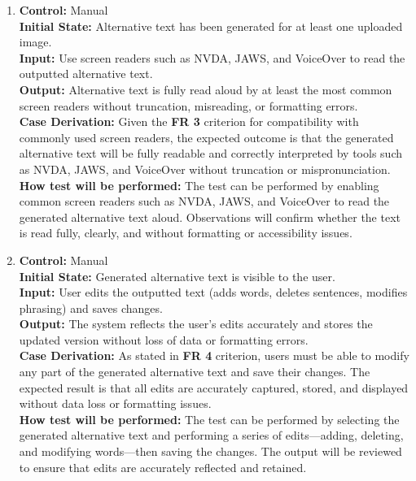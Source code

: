 \documentclass[12pt, titlepage]{article}
\begin{document}
\begin{enumerate}[label=FR-ST \arabic*., wide=0pt, leftmargin=*]
  \item{}
    {\bf Control:} Manual\\
    {\bf Initial State:} Alternative text has been generated for at
    least one uploaded image.\\
    {\bf Input:} Use screen readers such as NVDA, JAWS, and VoiceOver
    to read the outputted alternative text.\\
    {\bf Output:} Alternative text is fully read aloud by at least
    the most common screen readers without truncation, misreading, or
    formatting errors. \\
    {\bf  Case Derivation:} Given the \textbf{FR 3} criterion for
    compatibility with commonly used screen readers, the expected
    outcome is that the generated alternative text will be fully
    readable and correctly interpreted by tools such as NVDA, JAWS,
    and VoiceOver without truncation or mispronunciation.\\
    {\bf How test will be performed:} The test can be performed by
    enabling common screen readers such as NVDA, JAWS, and VoiceOver
    to read the generated alternative text aloud. Observations will
    confirm whether the text is read fully, clearly, and without
    formatting or accessibility issues.\\

  \item{}
    {\bf Control:} Manual\\
    {\bf Initial State:} Generated alternative text is visible to the user.\\
    {\bf Input:} User edits the outputted text (adds words, deletes
    sentences, modifies phrasing) and saves changes. \\
    {\bf Output:} The system reflects the user’s edits accurately and
    stores the updated version without loss of data or formatting errors.\\
    {\bf  Case Derivation:} As stated in \textbf{FR 4} criterion,
    users must be able to modify any part of the generated
    alternative text and save their changes. The expected result is
    that all edits are accurately captured, stored, and displayed
    without data loss or formatting issues.\\
    {\bf How test will be performed:} The test can be performed by
    selecting the generated alternative text and performing a series
    of edits—adding, deleting, and modifying words—then saving the
    changes. The output will be reviewed to ensure that edits are
    accurately reflected and retained.\\


\end{enumerate}
\end{document}
